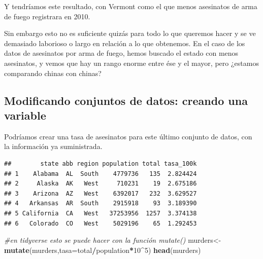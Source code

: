 \documentclass[
]{article}
\newenvironment{Shaded}{\begin{snugshade}}{\end{snugshade}}
\newcommand{\AttributeTok}[1]{\textcolor[rgb]{0.13,0.29,0.53}{#1}}
\newcommand{\CommentTok}[1]{\textcolor[rgb]{0.56,0.35,0.01}{\textit{#1}}}
\newcommand{\DecValTok}[1]{\textcolor[rgb]{0.00,0.00,0.81}{#1}}
\newcommand{\FunctionTok}[1]{\textcolor[rgb]{0.13,0.29,0.53}{\textbf{#1}}}
\newcommand{\NormalTok}[1]{#1}
\newcommand{\OtherTok}[1]{\textcolor[rgb]{0.56,0.35,0.01}{#1}}
\newcommand{\SpecialCharTok}[1]{\textcolor[rgb]{0.81,0.36,0.00}{\textbf{#1}}}
\begin{document}
Y tendríamos este resultado, con Vermont como el que menos asesinatos de
arma de fuego registrara en 2010.

Sin embargo esto no es suficiente quizás para todo lo que queremos hacer
y se ve demasiado laborioso o largo en relación a lo que obtenemos. En
el caso de los datos de asesinatos por arma de fuego, hemos buscado el
estado con menos asesinatos, y vemos que hay un rango enorme entre ése y
el mayor, pero ¿estamos comparando chinas con chinas?

\subsection{Modificando conjuntos de datos: creando una
variable}\label{modificando-conjuntos-de-datos-creando-una-variable}

Podríamos crear una tasa de asesinatos para este último conjunto de
datos, con la información ya suministrada.

\begin{Shaded}
\end{Shaded}

\begin{verbatim}
##        state abb region population total tasa_100k
## 1    Alabama  AL  South    4779736   135  2.824424
## 2     Alaska  AK   West     710231    19  2.675186
## 3    Arizona  AZ   West    6392017   232  3.629527
## 4   Arkansas  AR  South    2915918    93  3.189390
## 5 California  CA   West   37253956  1257  3.374138
## 6   Colorado  CO   West    5029196    65  1.292453
\end{verbatim}

\begin{Shaded}
\begin{Highlighting}[]
\CommentTok{\#en tidyverse esto se puede hacer con la función mutate()}
\NormalTok{murders}\OtherTok{\textless{}{-}}\FunctionTok{mutate}\NormalTok{(murders,}\AttributeTok{tasa=}\NormalTok{total}\SpecialCharTok{/}\NormalTok{population}\SpecialCharTok{*}\DecValTok{10}\SpecialCharTok{\^{}}\DecValTok{5}\NormalTok{)}
\FunctionTok{head}\NormalTok{(murders)}
\end{Highlighting}
\end{Shaded}
\end{document}
